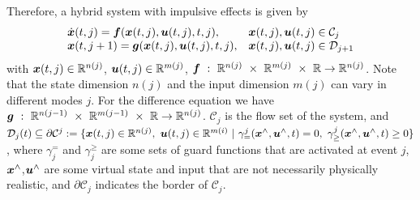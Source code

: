 \documentclass[../DC2017114Bouma.tex]{subfiles}
\begin{document}
Therefore, a hybrid system with impulsive effects is given by
\begin{equation}
\begin{array}{ll}
\dot{{\boldsymbol{x}}}(t,j) ={\boldsymbol{f}}({\boldsymbol{x}}(t,j),{\boldsymbol{u}}(t,j),t,j),& {\boldsymbol{x}}(t,j),{\boldsymbol{u}}(t,j)\in \mathcal{C}_j\\
{\boldsymbol{x}}(t,j+1) = {\boldsymbol{g}}({\boldsymbol{x}}(t,j),{\boldsymbol{u}}(t,j),t,j),& {\boldsymbol{x}}(t,j),{\boldsymbol{u}}(t,j)\in \mathcal{D}_{j+1}
\end{array}\label{eq:hybimp}
\end{equation}
%
%
%
%
%
%
%
%
%
%
%
%
%
%
%
%
%
%
%
with ${\boldsymbol{x}}(t,j)\in\mathbb{R}^{n(j)}$, ${\boldsymbol{u}}(t,j)\in\mathbb{R}^{m(j)}$, $\fb\ :\ \Rbb^{n(j)}\ \times\ \Rbb^{m(j)}\ \times\ \Rbb\rightarrow \Rbb^{n(j)}$. Note that the state dimension $n(j)$ and the input dimension $m(j)$ can vary in different modes $j$. For the difference equation we have $\gb\ :\ \Rbb^{n(j-1)}\ \times\ \Rbb^{m(j-1)}\ \times\ \Rbb\rightarrow \Rbb^{n(j)}$. $\mathcal{C}_j$ is the flow set of the system, and $\mathcal{D}_j(t) \subseteq \partial \mathcal{C}^j := \{\xb(t,j)\in\Rbb^{n(j)},\ \ub(t,j)\in\Rbb^{m(i)}\ |\ \gamma_{=}^j(\xb^{\wedge},\ub^{\wedge},t) = 0, \ \gamma_{\geq}^j(\xb^{\wedge},\ub^{\wedge},t) \geq 0\}$, where $\gamma^{=}_j$ and $\gamma^{\geq}_j$ are some sets of guard functions that are activated at event $j$, ${\boldsymbol{x}}^{\wedge}$,${\boldsymbol{u}}^{\wedge}$ are some virtual state and input that are not necessarily physically realistic, and $\partial \mathcal{C}_j$ indicates the border of $\mathcal{C}_j$.
\end{document}

